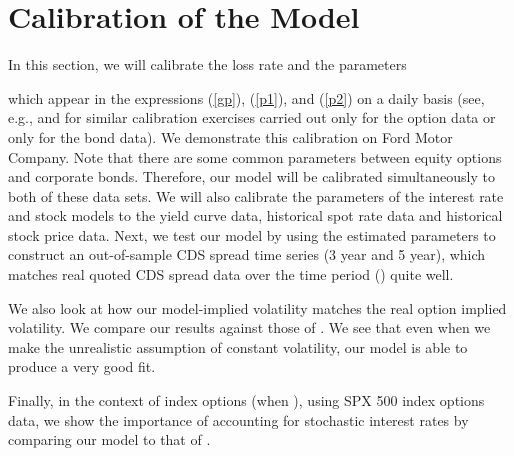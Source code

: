 \documentclass[11pt]{article}
\numberwithin{equation}{section}
\begin{document}
\section{Calibration of the Model}\label{sec:calibration}

 In this section, we will calibrate the loss rate  and the parameters 

which appear in the expressions (\ref{gp}), (\ref{p1}), and (\ref{p2}) on a daily basis (see, e.g., \cite{ronnie-timescale} and \cite{papa} for similar calibration exercises carried out only for the option data or only for the bond data).
We demonstrate this calibration on Ford Motor
Company. Note that there are some common parameters between equity options and corporate bonds. Therefore, our model will be calibrated simultaneously to both of these data sets. We will also calibrate the parameters of the interest rate and stock models to the yield curve data, historical spot rate data and historical stock price data.
Next, we test our model by using the estimated parameters to
construct an out-of-sample  CDS spread time series (3 year and 5 year), which
matches real quoted CDS spread data over the time
period () quite well. 

We also look at how our model-implied volatility matches the real option implied volatility.
We compare our results against those of \cite{ronnie-timescale}. We see that even when we make the
unrealistic assumption of constant volatility, our model is able to produce a very good fit. 

Finally, in the context of index options (when ), using SPX 500 index
options data,  we show the importance of accounting for stochastic interest rates by comparing our model to that of \cite{sircar, ronnie-timescale}.
\end{document}
